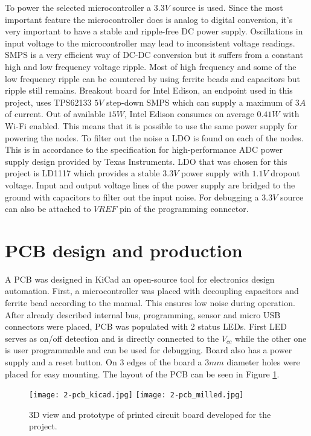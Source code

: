 To power the selected microcontroller a $3.3V$ source is used. Since the most important feature the microcontroller does is analog to digital conversion, it's very important to have a stable and ripple-free \ac{DC} power supply. Oscillations in input voltage to the microcontroller may lead to inconsistent voltage readings. \ac{SMPS} is a very efficient way of \ac{DC}-\ac{DC} conversion but it suffers from a constant high and low frequency voltage ripple. Most of high frequency and some of the low frequency ripple can be countered by using ferrite beads and capacitors but ripple still remains. Breakout board for Intel Edison, an endpoint used in this project, uses TPS62133 $5V$ step-down \ac{SMPS} which can supply a maximum of $3A$ of current\cite{edison_breakout}\cite{TPS6213}. Out of available $15W$, Intel Edison consumes on average $0.41W$ with Wi-Fi enabled. This means that it is possible to use the same power supply for powering the nodes. To filter out the noise a \ac{LDO} is found on each of the nodes. This is in accordance to the specification for high-performance \ac{ADC} power supply design provided by Texas Instruments\cite{SMPS}. \ac{LDO} that was chosen for this project is LD1117 which provides a stable $3.3V$ power supply with $1.1V$ dropout voltage. Input and output voltage lines of the power supply are bridged to the ground with capacitors to filter out the input noise. For debugging a $3.3V$ source can also be attached to ${VREF}$ pin of the programming connector.


\section{PCB design and production}

A \ac{PCB} was designed in KiCad an open-source tool for electronics design automation. First, a microcontroller was placed with decoupling capacitors and ferrite bead according to the manual\cite{ATSAMD}. This ensures low noise during operation. After already described internal bus, programming, sensor and  micro USB connectors were placed, \ac{PCB} was populated with 2 status \ac{LED}s. First \ac{LED} serves as on/off detection and is directly connected to the $V_{cc}$ while the other one is user programmable and can be used for debugging. Board also has a power supply and a reset button. On 3 edges of the board a $3mm$ diameter holes were placed for easy mounting. The layout of the \ac{PCB} can be seen in Figure \ref{fig:pcb_kicad}.

\begin{figure}[h]
  \begin{center}
    \texttt{[image: 2-pcb\_kicad.jpg]}
    \hspace{1cm}
    \texttt{[image: 2-pcb\_milled.jpg]}
  \end{center}
  \caption{3D view and prototype of printed circuit board developed for the project.}
  \label{fig:pcb_kicad}
\end{figure}


